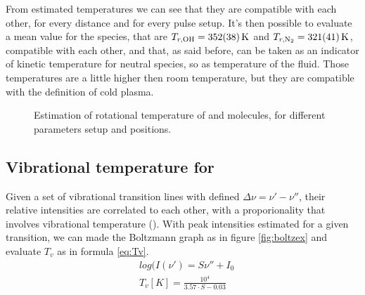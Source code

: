 From estimated temperatures we can see that they are compatible with each other, for every distance and for every pulse setup. It's then possible to evaluate a mean value for the species, that are $T_{r,\ce{OH}} = \SI{352(38)}{\kelvin}$ and $T_{r,\ce{N2}} = \SI{321(41)}{\kelvin}$, compatible with each other, and that, as said before, can be taken as an indicator of kinetic temperature for neutral species, so as temperature of the fluid. Those temperatures are a little higher then room temperature, but they are compatible with the definition of cold plasma.
\begin{figure}
\centering
  \hfill
 \caption{Estimation of rotational temperature of  and  molecules, for different parameters setup and positions.}
 \label{fig:Trval}
\end{figure}

\subsection{Vibrational temperature for }
Given a set of vibrational transition lines with defined $\Delta \nu = \nu' - \nu''$, their relative intensities are correlated to each other, with a proporionality that involves vibrational temperature (\cite{Britun_2007}).
With peak intensities estimated for a given transition, we can made the Boltzmann graph as in figure \ref{fig:boltzex} and evaluate $T_v$ as in formula \ref{eq:Tv}.
\begin{equation}
 \begin{split}
  & log(I(\nu') = S \nu'' + I_0 \\
  & T_v [K] = \frac{10^4}{3.57 \cdot S - 0.03}
 \end{split}
\label{eq:Tv}
\end{equation}

